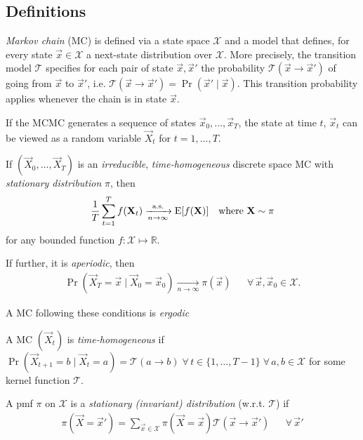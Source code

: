 \subsection{Definitions}
\begin{definition}
    \emph{Markov chain} (MC) is defined via a state space $\mathcal X$ and a model that defines, for every state $\vec x \in \mathcal X$ a next-state distribution over $\mathcal X$. More precisely, the transition model $\mathcal T$ specifies for each pair of state $\vec x, \vec x'$ the probability $\mathcal T(\vec x \to \vec x')$ of going from $\vec x$ to $\vec x'$, i.e. $\mathcal T(\vec x \to \vec x') = \Pr(\vec x' \mid \vec x)$. This transition probability applies whenever the chain is in state $\vec x$.
\end{definition}

If the MCMC generates a sequence of states $\vec x_0, \dotsc, \vec x_T$, the state at time $t$, $\vec x_t$ can be viewed as a random variable $\vec X_t$ for $t = 1, \dotsc, T$.

\begin{theorem}
    If $(\vec X_0, \dotsc, \vec X_T)$ is an \emph{irreducible}, \emph{time-homogeneous} discrete space MC with \emph{stationary distribution} $\pi$, then
    \begin{align}
        \frac{1}{T} \sum_{t = 1}^T f(\boldsymbol{\mathbf{X}}_t) \xrightarrow[n \to \infty]{\text{a.s.}} \operatorname{\mathrm{E}}[f(\boldsymbol{\mathbf{X}})] && \text{where } \boldsymbol{\mathbf{X}} \sim \pi
    \end{align}
    for any bounded function $f: \mathcal X \mapsto \mathbb R$.

    If further, it is \emph{aperiodic}, then
    \begin{align}
        \Pr(\vec X_T = \vec x \mid \vec X_0 = \vec x_0) \xrightarrow[n \to \infty]{} \pi(\vec x) && \forall\,\vec x, \vec x_0 \in \mathcal X.
    \end{align}

    A MC following these conditions is \emph{ergodic}
\end{theorem}

\begin{definition}
    A MC $(\vec X_t)$ is \emph{time-homogeneous} if $\Pr(\vec X_{t + 1} = b \mid \vec X_t = a) = \mathcal T(a \to b) \;\forall\, t \in \{1, \dotsc, T - 1\} \;\forall\, a, b \in \mathcal X$ for some kernel function $\mathcal T$.
\end{definition}

\begin{definition}
    A pmf $\pi$ on $\mathcal X$ is a \emph{stationary (invariant) distribution} (w.r.t. $\mathcal T$) if
    \begin{align}
        \pi(\vec X = \vec x') = \sum_{\vec x \in \mathcal X} \pi(\vec X = \vec x)\mathcal T(\vec x \to \vec x') && \forall\,\vec x' \label{eqn:stationary}
    \end{align}
\end{definition}

